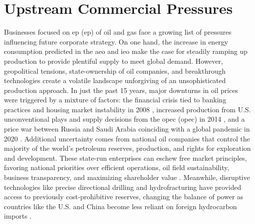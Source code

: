 \section{Upstream Commercial Pressures}\label{ch1:upstream}
Businesses focused on \acrlong{ep} (\acrshort{ep}) of oil and gas face a growing list of pressures influencing future corporate strategy. On one hand, the increase in energy consumption predicted in the \acrshort{aeo} and \acrshort{ieo} make the case for steadily ramping up production to provide plentiful supply to meet global demand. However, geopolitical tensions, state-ownership of oil companies, and breakthrough technologies create a volatile landscape unforgiving of an unsophisticated production approach. In just the past 15 years, major downturns in oil prices were triggered by a mixture of factors: the financial crisis tied to banking practices and housing market instability in 2008 \citep{singh_2007-2008_2021}, increased production from U.S. unconventional plays and supply decisions from the \acrlong{opec} (\acrshort{opec}) in 2014 \citep{lioudis_what_2021}, and a price war between Russia and Saudi Arabia coinciding with a global pandemic in 2020 \citep{blessing_what_2021}. Additional uncertainty comes from national oil companies that control the majority of the world’s petroleum reserves, production, and rights for exploration and development. These state-run enterprises can eschew free market principles, favoring national priorities over efficient operations, oil field sustainability, business transparency, and maximizing shareholder value \citep{pirog_role_2007}. Meanwhile, disruptive technologies like precise directional drilling and hydrofracturing have provided access to previously cost-prohibitive reserves, changing the balance of power as countries like the U.S. and China become less reliant on foreign hydrocarbon imports \citep{shuen_dynamic_2014}.

